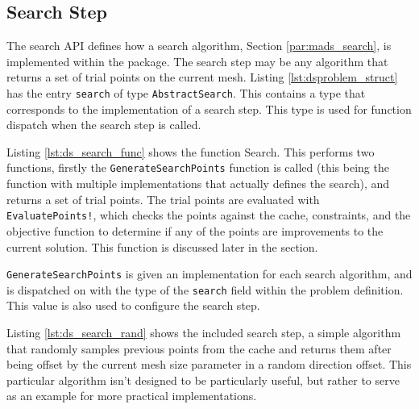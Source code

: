 \begin{figure}[h]
    
\end{figure}


\subsection{Search Step}

The search API defines how a search algorithm, Section \ref{par:mads_search}, is implemented within the package. The search step may be any algorithm that returns a set of trial points on the current mesh. Listing \ref{lst:dsproblem_struct} has the entry \texttt{search} of type \texttt{AbstractSearch}. This contains a type that corresponds to the implementation of a search step. This type is used for function dispatch when the search step is called. 

Listing \ref{lst:ds_search_func} shows the function Search. This performs two functions, firstly the \texttt{GenerateSearchPoints} function is called (this being the function with multiple implementations that actually defines the search), and returns a set of trial points. The trial points are evaluated with \texttt{EvaluatePoints!}, which checks the points against the cache, constraints, and the objective function to determine if any of the points are improvements to the current solution. This function is discussed later in the section. 



\texttt{GenerateSearchPoints} is given an implementation for each search algorithm, and is dispatched on with the type of the \texttt{search} field within the problem definition. This value is also used to configure the search step.



Listing \ref{lst:ds_search_rand} shows the included search step, a simple algorithm that randomly samples previous points from the cache and returns them after being offset by the current mesh size parameter in a random direction offset. This particular algorithm isn't designed to be particularly useful, but rather to serve as an example for more practical implementations. 

